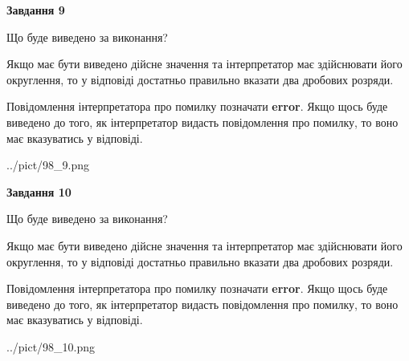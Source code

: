 \documentclass[12pt, ukrainian]{article}
\begin{document}
{\begin {Large}
{\begin {center}\textbf{Завдання 9}\end {center}}\par
Що буде виведено за виконання? \par

Якщо має бути виведено дійсне значення та інтерпретатор має здійснювати його округлення, 
то у відповіді достатньо правильно вказати два дробових розряди.

Повідомлення інтерпретатора про помилку позначати \textbf{error}.
Якщо щось буде виведено до того, як інтерпретатор видасть повідомлення про помилку, 
то воно має вказуватись у відповіді. \par

\begin{center}
	{../pict/98_9.png}
\end{center}
\newpage

{\begin {center}\textbf{Завдання 10}\end {center}}\par
Що буде виведено за виконання? \par

Якщо має бути виведено дійсне значення та інтерпретатор має здійснювати його округлення, 
то у відповіді достатньо правильно вказати два дробових розряди.

Повідомлення інтерпретатора про помилку позначати \textbf{error}.
Якщо щось буде виведено до того, як інтерпретатор видасть повідомлення про помилку, 
то воно має вказуватись у відповіді. \par

\begin{center}
	{../pict/98_10.png}
\end{center}
\newpage

\end {Large}}
\end{document}
